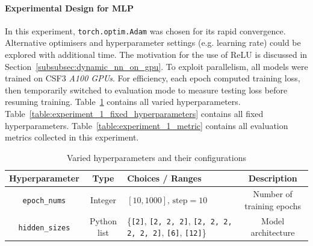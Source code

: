 \paragraph{Experimental Design for MLP}
In this experiment, \texttt{torch.optim.Adam} was chosen for its rapid convergence. Alternative optimisers and hyperparameter settings (e.g. learning rate) could be explored with additional time. The motivation for the use of ReLU is discussed in Section~\ref{subsubsec:dynamic_nn_on_gpu}. To exploit parallelism, all models were trained on CSF3 \textit{A100 GPUs}. For efficiency, each epoch computed training loss, then temporarily switched to evaluation mode to measure testing loss before resuming training. Table~\ref{table:experiment_1_varied_hyperparameters} contains all varied hyperparameters. Table~\ref{table:experiment_1_fixed_hyperparameters} contains all fixed hyperparameters. Table~\ref{table:experiment_1_metric} contains all evaluation metrics collected in this experiment. 

\begin{table}[H]
    \centering
    \begin{tabular}{|c|c|p{5cm}|c|}
        \hline
        Hyperparameter & Type & Choices / Ranges & Description \\
        \hline
        \small\texttt{epoch\_nums} & Integer & $[10, 1000]\text{, step}=10$ & Number of training epochs \\
        \hline
        \small\texttt{hidden\_sizes} & Python list & \{\texttt{[2]}, \texttt{[2, 2, 2]}, \texttt{[2, 2, 2, 2, 2, 2]}, \texttt{[6]}, \texttt{[12]}\} & Model architecture \\
        \hline
    \end{tabular}
    \caption{Varied hyperparameters and their configurations}
    \label{table:experiment_1_varied_hyperparameters}
\end{table}

